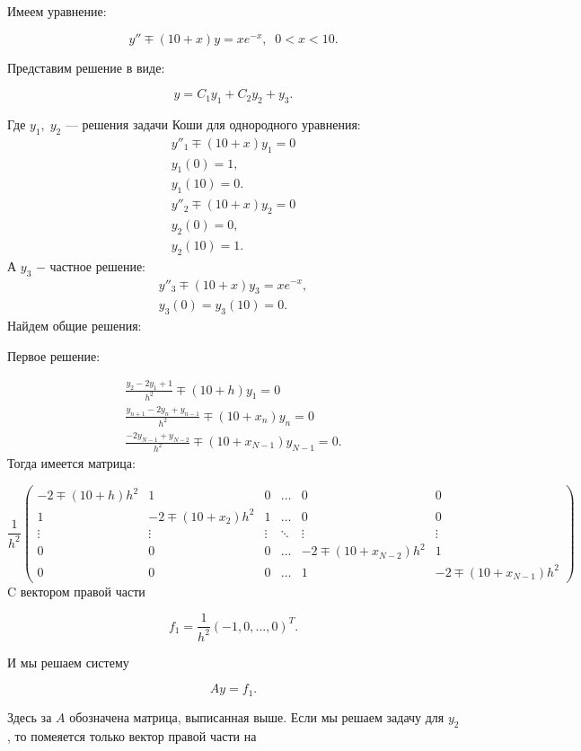 \documentclass[a4paper]{article}
\begin{document}
\begin{sol}
Имеем уравнение:

$$
y'' \mp (10+x)y = x e^{-x},\;\; 0< x< 10.
$$

Представим решение в виде:

$$
y = C_1 y_1 + C_2 y_2 + y_3.
$$

Где $y_1,\; y_2$ --- решения задачи Коши для однородного уравнения:
\begin{gather*}
y''_1 \mp (10+x) y_1 =0\\
y_1(0) = 1,\\
y_1(10) = 0.
\end{gather*}
\begin{gather*}
y''_2 \mp (10+x) y_2 = 0\\
y_2(0) = 0,\\
y_2(10) = 1.
\end{gather*}
А $y_3$ $-$ частное решение:
\begin{gather*}
y''_3 \mp (10+x) y_3 = x e^{-x},\\
y_3(0) = y_3(10) = 0.
\end{gather*}
Найдем общие решения:

Первое решение:

\begin{gather*}
\frac{y_{2} - 2y_1 + 1}{h^2} \mp (10+h) y_1 = 0\\
\frac{y_{n+1} - 2y_n + y_{n-1}}{h^2} \mp (10+x_n) y_n = 0\\
\frac{-2y_{N-1} + y_{N-2}}{h^2} \mp (10 + x_{N-1}) y_{N-1} = 0.
\end{gather*}
Тогда имеется матрица:

$$
\frac{1}{h^2} \begin{pmatrix}
-2 \mp (10+h)h^2 & 1 & 0 & \dots & 0 & 0\\
1 & -2 \mp (10 + x_2)h^2 & 1 & \dots & 0 & 0\\
\vdots & \vdots & \vdots & \ddots & \vdots & \vdots\\
0 & 0 & 0 & \dots & -2 \mp (10+x_{N-2})h^2 & 1\\
0 & 0 & 0 & \dots &  1 & -2 \mp (10+x_{N-1})h^2
\end{pmatrix}
$$
C вектором правой части

$$
f_1 = \frac{1}{h^2} (-1, 0,..., 0)^{T}.
$$

И мы решаем систему

$$
Ay = f_1.
$$

Здесь за $A$ обозначена матрица, выписанная выше. Если мы решаем задачу для $y_2$, то помеяется только вектор правой части на


\end{sol}
\end{document}
